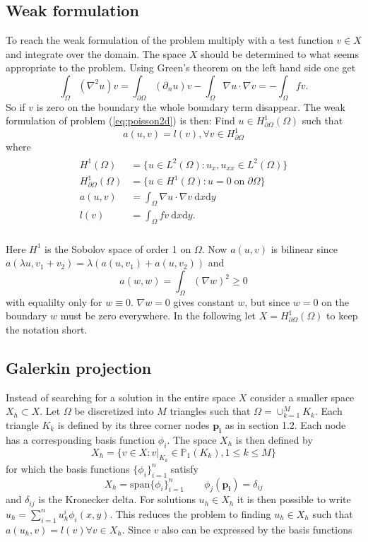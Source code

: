 \documentclass[paper=a4, fontsize=11pt]{scrartcl} %
\begin{document}
\subsection{Weak formulation}
To reach the weak formulation of the problem multiply with a test function $v\in X$ and integrate over the domain. The space $X$ should be determined to what seems appropriate to the problem. Using Green's theorem on the left hand side one get 
\[\int_{\Omega}  (\nabla^2u)v = \int_{\partial\Omega} (\partial_n u) v -\int_{\Omega} \nabla u \cdot \nabla v = -\int_{\Omega} f v.\]
So if $v$ is zero on the boundary the whole boundary term disappear. The weak formulation of problem (\ref{eq:poisson2d}) is then: Find $u\in H^1_{\partial\Omega}(\Omega)$ such that
\[a(u,v) = l(v), \forall v \in H^1_{\partial\Omega}\]
where 
\begin{eqnarray}
\begin{aligned}
H^1(\Omega) &= \{u \in L^2(\Omega) : u_x, u_{xx} \in L^2(\Omega)\} \\
H^1_{\partial\Omega}(\Omega) &= \{u\in H^1(\Omega) : u=0 \; \mathrm{on} \;  \partial\Omega\} \\
a(u,v) &= \int_{\Omega} \nabla u\cdot\nabla v \: \mathrm{d}x\mathrm{d}y\\
l(v) &= \int_{\Omega} f v \: \mathrm{d}x\mathrm{d}y.\\
\end{aligned}
\label{eq:poisson2d:Weak}
\end{eqnarray}

Here $H^1$ is the Sobolov space of order 1 on $\Omega$. Now $a(u,v)$ is bilinear since $a(\lambda u,v_1+v_2)=\lambda\left(a(u,v_1)+a(u,v_2)\right)$ and
\[a(w,w)=\int_{\Omega} (\nabla w)^2 \geq 0\] 
with equalilty only for $w\equiv 0$. $\nabla w=0$ gives constant $w$, but since $w=0$ on the boundary $w$ must be zero everywhere. In the following let $X=H^1_{\partial\Omega}(\Omega)$ to keep the notation short.

\subsection{Galerkin projection}
Instead of searching for a solution in the entire space $X$ consider a smaller space $X_h \subset X$. Let $\Omega$ be discretized into $M$ triangles such that $\Omega = \cup^M_{k=1} K_k$. Each triangle $K_k$ is defined by its three corner nodes $\mathbf{p_i}$ as in section 1.2. Each node has a corresponding basis function $\phi_i$. The space $X_h$ is then defined by
\[ X_h = \{v \in X : v|_{K_k} \in \mathbb{P}_1(K_k),1\leq k\leq M\}\] 
for which the basis functions $\{\phi_i\}^n_{i=1}$ satisfy
\[ X_h = \mathrm{span}\{\phi_i\}^n_{i=1} \qquad \phi_j(\mathbf{p_i})=\delta_{ij}\]
and $\delta_{ij}$ is the Kronecker delta. For solutions $u_h \in X_h$ it is then possible to write $u_h=\sum^n_{i=1} u^i_h\phi_i(x,y)$. This reduces the problem to finding $u_h \in X_h$ such that $a(u_h,v)=l(v) \forall v\in X_h$.
Since $v$ also can be expressed by the basis functions
\end{document}
